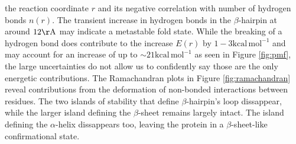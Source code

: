 \documentclass{article}[12pt]
\numberwithin{equation}{section}
\begin{document}
the reaction coordinate $r$ and its negative correlation with number of hydrogen
bonds $n(r)$. The transient increase in hydrogen bonds in the $\beta$-hairpin at
around $12\mathrm{\AA}$ may indicate a metastable fold state. While the breaking
of a hydrogen bond does contribute to the increase $E(r)$ by
$1-3\mathrm{kcal\,mol^{-1}}$ and may account for an increase of up to
$\sim21\mathrm{kcal\,mol^{-1}}$ as seen in Figure \ref{fig:pmf}, the large
uncertainties do not allow us to confidently say those are the only energetic
contributions. The Ramachandran plots in
Figure \ref{fig:ramachandran} reveal contributions from the deformation of non-bonded
interactions between residues. The two islands of stability that define $\beta$-hairpin's
loop dissappear, while the larger island defining the $\beta$-sheet remains largely
intact. The island defining the $\alpha$-helix dissappears too, leaving the
protein in a $\beta$-sheet-like confirmational state.
\end{document}

